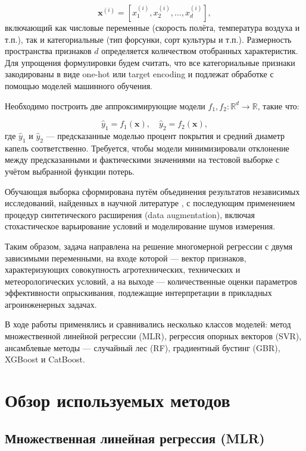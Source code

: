 \begin{equation}
\mathbf{x}^{(i)} = \left[ x_1^{(i)}, x_2^{(i)}, \ldots, x_d^{(i)} \right],
\end{equation}
включающий как числовые переменные (скорость полёта, температура воздуха и т.п.), так и категориальные (тип форсунки, сорт культуры и т.п.). Размерность пространства признаков $d$ определяется количеством отобранных характеристик. Для упрощения формулировки будем считать, что все категориальные признаки закодированы в виде one-hot или target encoding и подлежат обработке с помощью моделей машинного обучения.

Необходимо построить две аппроксимирующие модели $f_1, f_2: \mathbb{R}^d \to \mathbb{R}$, такие что:

\begin{equation}
	\hat{y}_1 = f_1(\mathbf{x}), \quad \hat{y}_2 = f_2(\mathbf{x}),
\end{equation}
где $\hat{y}_1$ и $\hat{y}_2$ --- предсказанные моделью процент покрытия и средний диаметр капель соответственно. Требуется, чтобы модели минимизировали отклонение между предсказанными и фактическими значениями на тестовой выборке с учётом выбранной функции потерь. 

Обучающая выборка сформирована путём объединения результатов независимых  исследований, найденных в научной литературе \cite{Liu2025, Wu2025}, с последующим применением процедур синтетического расширения (data augmentation), включая стохастическое варьирование условий и моделирование шумов измерения.

Таким образом, задача направлена на решение многомерной регрессии с двумя зависимыми переменными, на входе которой --- вектор признаков, характеризующих совокупность агротехнических, технических и метеорологических условий, а на выходе --- количественные оценки параметров эффективности опрыскивания, подлежащие интерпретации в прикладных агроинженерных задачах.

В ходе работы применялись и сравнивались несколько классов моделей: метод множественной линейной регрессии (MLR), регрессия опорных векторов (SVR), ансамблевые методы --- случайный лес (RF), градиентный бустинг (GBR), XGBoost и CatBoost.

\section{Обзор используемых методов} \label{ch1:methods}
\subsection{Множественная линейная регрессия (MLR)}

